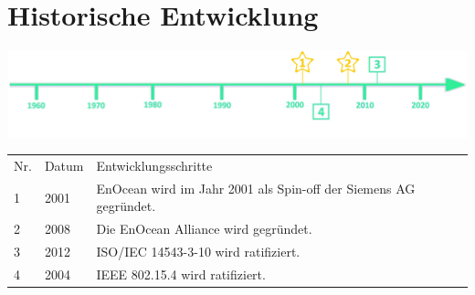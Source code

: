 \section*{Historische Entwicklung}
\includegraphics[width=\textwidth]{Kapitel/EnOcean/Grafiken/Zeitstrahl_MitEinfaerben.jpg}
\par
\noindent
{}
\begin{tabular}{p{0.5 cm}p{1.5 cm}p{15.55 cm}}
	Nr. & Datum & Entwicklungsschritte\\
	1 & 2001 & EnOcean wird im Jahr 2001 als Spin-off der Siemens AG gegründet.\\
	2 & 2008 & Die EnOcean Alliance wird gegründet.\\
	3 & 2012 & ISO/IEC 14543-3-10 wird ratifiziert.\\
	4 & 2004 & IEEE 802.15.4 wird ratifiziert.\\
\end{tabular}
\par

